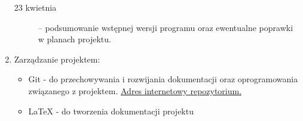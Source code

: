 \documentclass[a4paper]{article}
\begin{document}
\begin{enumerate}
\begin{description}
\item[23 kwietnia] – podsumowanie wstępnej wersji programu oraz ewentualne poprawki w planach projektu.
\end{description}

\item Zarządzanie projektem:
\begin{itemize}
\item Git - do przechowywania i rozwijania dokumentacji oraz oprogramowania związanego z projektem.
\href{https://github.com/hizonglol/wds-2016}{Adres internetowy repozytorium.}
\item LaTeX - do tworzenia dokumentacji projektu
\end{itemize}
\end{enumerate}
\end{document}
